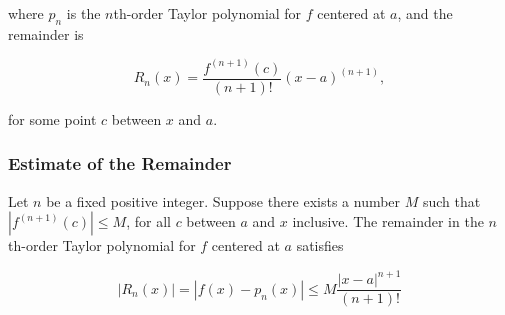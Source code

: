where $p_n$ is the $n$th-order Taylor polynomial for $f$ centered at $a$, and the remainder is

\begin{equation}
    R_n(x) = \frac{f^{(n + 1)}(c)}{(n + 1)!}(x - a)^{(n + 1)},
\end{equation}

for some point $c$ between $x$ and $a$.

\subsubsection{Estimate of the Remainder}
Let $n$ be a fixed positive integer. Suppose there exists a number $M$ such that $|f^{(n + 1)}(c)| \leq M$, for all $c$ between $a$ and $x$ inclusive. The remainder in the $n$th-order Taylor polynomial for $f$ centered at $a$ satisfies

\begin{equation}
    |R_n(x)| = |f(x) - p_n(x)| \leq M\frac{|x - a|^{n + 1}}{(n + 1)!}
\end{equation}
